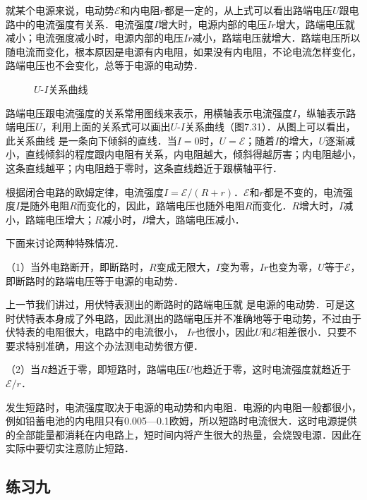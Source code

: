 就某个电源来说，电动势$\mathcal{E}$和内电阻$r$都是一定的，从上式可以看出路端电压$U$跟电路中的电流强度有关系．电流强度$I$增大时，电源内部的电压$Ir$增大，路端电压就减小；电流强度减小时，电源内部的电压$Ir$减小，路端电压就增大．路端电压所以随电流而变化，根本原因是电源有内电阻，如果没有内电阻，不论电流怎样变化，路端电压也不会变化，总等于电源的电动势．

\begin{figure}[htp]\centering
\caption{$U$-$I$关系曲线}
\end{figure}

路端电压跟电流强度的关系常用图线来表示，用横轴表示电流强度$I$，纵轴表示路端电压$U$，利用上面的关系式可以画出$U$-$I$关系曲线（图7.31）．从图上可以看出，此关系曲线
是一条向下倾斜的直线．当$I=0$时，$U=\mathcal{E}$；随着$I$的增大，$U$逐渐减小，直线倾斜的程度跟内电阻有关系，内电阻越大，倾斜得越厉害；内电阻越小，这条直线越平；内电阻趋于零时，这条直线趋近于跟横轴平行．


根据闭合电路的欧姆定律，电流强度$I=\mathcal{E}/(R+r)$．$\mathcal{E}$和$r$都是不变的，电流强度$I$是随外电阻$R$而变化的，因此，路端电压也随外电阻$R$而变化．$R$增大时，$I$减小，路端电压增大；$R$减小时，$I$增大，路端电压减小．

下面来讨论两种特殊情况．

（1）当外电路断开，即断路时，$R$变成无限大，$I$变为零，$Ir$也变为零，$U$等于$\mathcal{E}$，即断路时的路端电压等于电源的电动势．

上一节我们讲过，用伏特表测出的断路时的路端电压就
是电源的电动势．可是这时伏特表本身成了外电路，因此测出的路端电压并不准确地等于电动势，不过由于伏特表的电阻很大，电路中的电流很小，
$Ir$也很小，因此$U$和$\mathcal{E}$相差很小．只要不要求特别准确，用这个办法测电动势很方便．

（2）当$R$趋近于零，即短路时，路端电压$U$也趋近于零，这时电流强度就趋近于$\mathcal{E}/r$．

发生短路时，电流强度取决于电源的电动势和内电阻．电源的内电阻一般都很小，例如铅蓄电池的内电阻只有0.005—0.1欧姆，所以短路时电流很大．这时电源提供的全部能量都消耗在内电路上，短时间内将产生很大的热量，会烧毁电源．因此在实际中要切实注意防止短路．

\subsection*{练习九}

